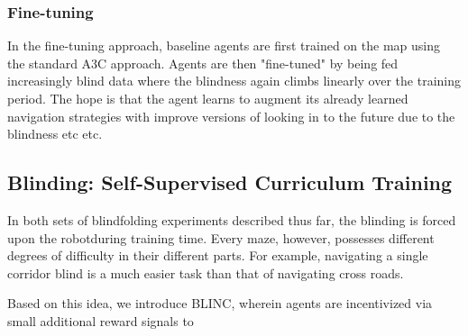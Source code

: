\subsubsection{Fine-tuning}
In the fine-tuning approach, baseline agents are first trained on the map using the standard A3C approach. Agents are then "fine-tuned" by being fed increasingly blind data where the blindness again climbs linearly over the training period. The hope is that the agent learns to augment its already learned navigation strategies with improve versions of looking in to the future due to the blindness etc etc. 

\subsection{Blinding: Self-Supervised Curriculum Training}
In both sets of blindfolding experiments described thus far, the blinding is forced upon the robotduring training time. Every maze, however, possesses different degrees of difficulty in their different parts. For example, navigating a single corridor blind is a much easier task than that of navigating cross roads.

Based on this idea, we introduce BLINC, wherein agents are incentivized via small additional reward signals to 
